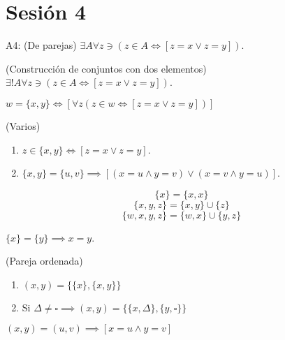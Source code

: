 \section{Sesión 4}

\begin{cajita}
	A4: (De parejas) $\exists A\forall z\ni (z\in A\iff [z=x\vee z=y])$. 
\end{cajita}


\begin{teorema}(Construcción de conjuntos con dos elementos)
	$\exists ! A \forall z\ni (z\in A\iff [z=x\vee z=y])$. 
\end{teorema}

\begin{definicion}
	$w=\{x,y\}\iff [\forall z(z\in w\iff[z=x\vee z=y] )]$
\end{definicion}

\begin{teorema}(Varios)
	\begin{enumerate}
		\item 	$z\in \{x,y\}\iff [z=x\vee z=y]$.
		\item $\{x,y\}=\{u,v\}\implies [(x=u\wedge y=v)\vee (x=v\wedge y=u)]$.
	\end{enumerate}
\end{teorema}

\begin{teorema}
	$$\{x\}=\{x,x\}$$
	$$\{x,y,z\}=\{x,y\}\cup \{z\}$$
	$$\{w,x,y,z\}=\{w,x\}\cup \{y,z\}$$
\end{teorema}

\begin{teorema}
	$\{x\}=\{y\}\implies x=y$. 
\end{teorema}

\begin{definicion}(Pareja ordenada)
	\begin{enumerate}
		\item $(x,y)=\{\{x\},\{x,y\}\}$
		\item Si $\Delta \neq \square \implies (x,y)=\{\{x,\Delta\}, \{y,\square\}\}$
	\end{enumerate}
\end{definicion}

\begin{teorema}
	$(x,y)=(u,v)\implies [x=u\wedge y=v]$
\end{teorema}
